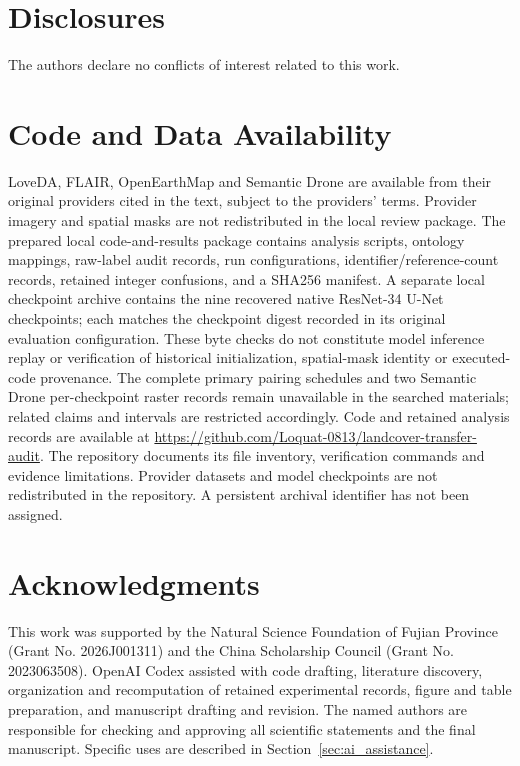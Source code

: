 \section*{Disclosures}
The authors declare no conflicts of interest related to this work.

\section*{Code and Data Availability}
LoveDA, FLAIR, OpenEarthMap and Semantic Drone are available from their original providers cited in the text, subject to the providers' terms. Provider imagery and spatial masks are not redistributed in the local review package. The prepared local code-and-results package contains analysis scripts, ontology mappings, raw-label audit records, run configurations, identifier/reference-count records, retained integer confusions, and a SHA256 manifest. A separate local checkpoint archive contains the nine recovered native ResNet-34 U-Net checkpoints; each matches the checkpoint digest recorded in its original evaluation configuration. These byte checks do not constitute model inference replay or verification of historical initialization, spatial-mask identity or executed-code provenance. The complete primary pairing schedules and two Semantic Drone per-checkpoint raster records remain unavailable in the searched materials; related claims and intervals are restricted accordingly. Code and retained analysis records are available at \url{https://github.com/Loquat-0813/landcover-transfer-audit}. The repository documents its file inventory, verification commands and evidence limitations. Provider datasets and model checkpoints are not redistributed in the repository. A persistent archival identifier has not been assigned.

\section*{Acknowledgments}
This work was supported by the Natural Science Foundation of Fujian Province (Grant No. 2026J001311) and the China Scholarship Council (Grant No. 2023063508). OpenAI Codex assisted with code drafting, literature discovery, organization and recomputation of retained experimental records, figure and table preparation, and manuscript drafting and revision. The named authors are responsible for checking and approving all scientific statements and the final manuscript. Specific uses are described in Section~\ref{sec:ai_assistance}.
